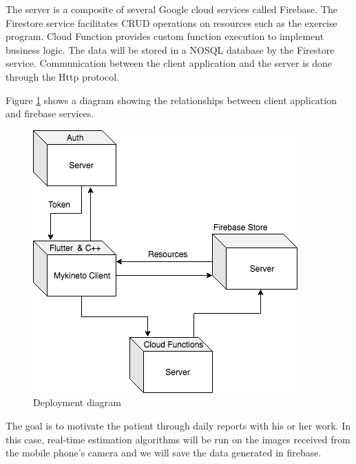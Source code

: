 
The server is a composite of several Google cloud services called Firebase. The Firestore service facilitates CRUD operations on resources such as the exercise program. Cloud Function provides custom function execution to implement business logic. The data will be stored in a NOSQL database by the Firestore service. Communication between the client application and the server is done through the Http protocol.


 Figure \ref{fig:uml-client-server} shows a diagram showing the relationships between client application and firebase services.
 
 \begin{figure}[htbp]
	\centerline{\includegraphics[scale=0.7]{fig/client-server.png}}  
	\caption{Deployment diagram}
	\label{fig:uml-client-server}
\end{figure}

The goal is to motivate the patient through daily reports with his or her work.
In this case, real-time estimation algorithms will be run on the images received from the mobile phone's camera and we will save the data generated in firebase.

